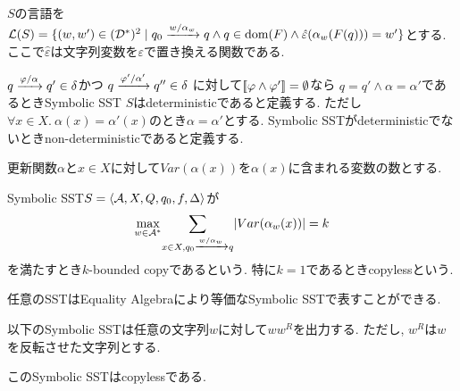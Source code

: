 \documentclass[uplatex,dvipdfmx,a4j]{jsreport}
\begin{document}
\begin{definition}
    $S$の言語を
    $\mathcal{L}(S) =
    \{ (w, w') \in (\mathcal{D}^*)^2 \mid
    q_0 \xrightarrow[]{w / \alpha_w} q \land
    q \in \mbox{dom}(F) \land
    \hat{\varepsilon}(\alpha_w(F(q))) = w' \}$とする.
    ここで$\hat{\varepsilon}$は文字列変数を$\varepsilon$で置き換える関数である.

    $q \xrightarrow[]{\varphi / \alpha} q' \in \delta$かつ
    $q \xrightarrow[]{\varphi' / \alpha'} q'' \in \delta$
    に対して${[ \! [{\varphi \land \varphi'}] \! ]} = \emptyset$なら
    $q = q' \land \alpha = \alpha'$であるときSymbolic SST $S$はdeterministicであると定義する.
    ただし$\forall x \in X.\ \alpha(x) = \alpha'(x)$のとき$\alpha = \alpha'$とする.
    Symbolic SSTがdeterministicでないときnon-deterministicであると定義する.
  \end{definition}

  \begin{definition}
    更新関数$\alpha$と$x \in X$に対して$Var(\alpha(x))$を$\alpha(x)$に含まれる変数の数とする.

    Symbolic SST$S = {\langle {\mathcal{A}, X, Q, q_0, f, \Delta} \rangle}$が
    \[
      \underset{w \in \mathcal{A}^*}{\mbox{max}}
        \underset{x \in X, q_0 \xrightarrow[]{w / \alpha_w} q}{\sum} |Var(\alpha_w(x))| = k
    \]
    を満たすとき$k$-bounded copyであるという. 特に$k = 1$であるときcopylessという.
  \end{definition}

  任意のSSTはEquality Algebraにより等価なSymbolic SSTで表すことができる.

  \begin{example}
    以下のSymbolic SSTは任意の文字列$w$に対して$ww^R$を出力する.
    ただし, $w^R$は$w$を反転させた文字列とする.
    \begin{center}
    \end{center}
    このSymbolic SSTはcopylessである.
  \end{example}
\end{document}
